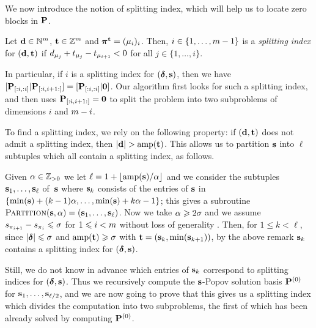 \documentclass[preprint]{sig-alternate-05-2015}
\begin{document}
We now introduce the notion of splitting index, which will help us to locate
zero blocks in $\msb$.

\vspace{-0.15cm}
\begin{dfn}
  Let $\shifts[d] \in \NN^\nbun$, $\shifts[t] \in \ZZ^\nbun$ and
  $\perm[{\shifts[t]}] = (\mu_i)_i$. Then, $i \in \{1,\ldots,\nbun-1\}$ is a
  \emph{splitting index} for $(\shifts[d],\shifts[t])$ if $d_{\mu_j} +
  \shift[t]{\mu_j} - \shift[t]{\mu_{i+1}} < 0$ for all $j \in \{1,\ldots,i\}$.
\end{dfn}

\vspace{-0.15cm}
In particular, if $i$ is a splitting index for $(\minDegs,\shifts)$, then we
have $[\subMat{\msb}{}{i}{}{i} | \subMat{\msb}{}{i}{i+1}{}] =
[\subMat{\msb}{}{i}{}{i} | \mat{0}]$. Our algorithm first looks for such a
splitting index, and then uses $\subMat{\msb}{}{i}{i+1}{} = \mat{0}$ to split
the problem into two subproblems of dimensions $i$ and $\nbun-i$.

To find a splitting index, we rely on the following property: if
$(\shifts[d],\shifts[t])$ does not admit a splitting index, then
$\sumVec{\shifts[d]} > \amp[\shifts[t]]$. This allows us to partition $\shifts$
into $\ell$ subtuples which all contain a splitting index, as follows.

Given $\alpha \in \ZZp$ we let $\ell = 1 + \lfloor \amp / \alpha \rfloor$ and
we consider the subtuples $\shifts_1,\ldots,\shifts_\ell$ of~$\shifts$ where
$\shifts_k$ consists of the entries of $\shifts$ in $\{\min(\shifts) + (k-1)
\alpha, \ldots, \min(\shifts) + k\alpha-1\}$; this gives a subroutine
$\algoname{Partition}(\shifts,\alpha) = (\shifts_1,\ldots,\shifts_\ell)$. Now
we take $\alpha \ge 2\degMod$ and we assume $\shift{\pi_{i+1}} - \shift{\pi_i}
\le \degMod$ for $1 \le i < \nbun$ without loss of generality \cite[Appendix
A]{JeNeScVi16}. Then, for $1\le k<\ell$, since $\sumVec{\minDegs} \le \degMod$
and $\amp[\shifts[t]] \ge \degMod$ with $\shifts[t] =
(\shifts_k,\min(\shifts_{k+1}))$, by the above remark $\shifts_k$ contains a
splitting index for $(\minDegs,\shifts)$.

Still, we do not know in advance which entries of $\shifts_k$ correspond to
splitting indices for $(\minDegs,\shifts)$. Thus we recursively compute the
$\shifts$-Popov solution basis $\msb^{(0)}$ for
$\shifts_1,\ldots,\shifts_{\ell/2}$, and we are now going to prove that this
gives us a splitting index which divides the computation into two subproblems,
the first of which has been already solved by computing $\msb^{(0)}$.
\end{document}
